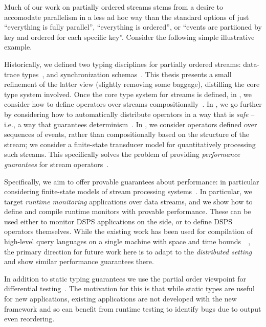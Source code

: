 Much of our work on partially ordered streams stems from a desire to accomodate parallelism in a less ad hoc way than the standard options of just ``everything is fully parallel'', ``everything is ordered'', or ``events are partiioned by key and ordered for each specific key''.
Consider the following simple illustrative example.

Historically, we defined two typing disciplines for partially ordered streams:
data-trace types~,
and synchronization schemas~.
This thesis presents a small refinement of the latter view (slightly removing some baggage), distilling the core type system involved.
Once the core type system for streams is defined,
in , we consider how to define operators over streams compositionally~.
In , we go further by considering how to automatically distribute operators in a way that is \emph{safe} -- i.e., a way that guarantees determinism~.
In , we consider operators defined over sequences of events, rather than compositionally based on the structure of the stream; we consider a finite-state transducer model for quantitatively processing such streams. This specifically solves the problem of providing \emph{performance guarantees} for stream operators~.

Specifically, we aim to offer provable guarantees about performance: in particular considering finite-state models of stream processing systems~.
In particular, we target \emph{runtime monitoring} applications
over data streams, and we show how to define and compile runtime monitors
with provable performance.
These can be used either to monitor DSPS applications on the side,
or to define DSPS operators themselves.
While the existing work has been used for compilation of high-level query languages on a single machine with space and time bounds~~\cite{QRE,StreamQRE},
the primary direction for future work here is to adapt to the \emph{distributed setting} and show similar performance guarantees there.

In addition to static typing guarantees
we use the partial order viewpoint for differential testing~.
The motivation for this is that while static types are useful
for new applications, existing applications are not developed with the new
framework and so can benefit from runtime testing to identify bugs due to
output even reordering.

